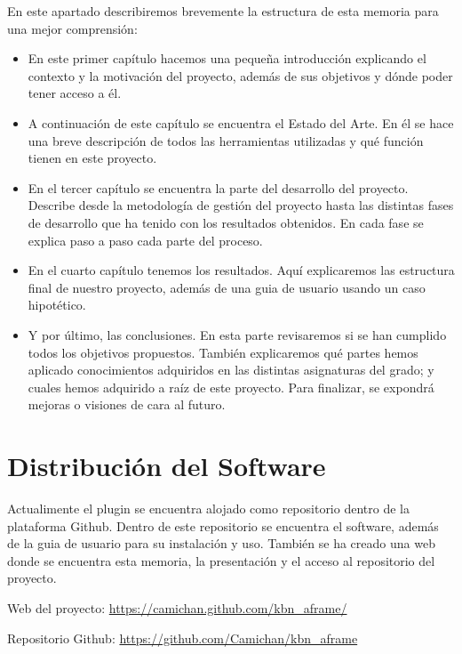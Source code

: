 \documentclass[a4paper, 12pt]{book}
\begin{document}
En este apartado describiremos brevemente la estructura de esta memoria para una mejor comprensión:

\begin{itemize}
    \item En este primer capítulo hacemos una pequeña introducción explicando el contexto y la motivación del proyecto, además de sus objetivos y dónde poder tener acceso a él.
    \item A continuación de este capítulo se encuentra el Estado del Arte. En él se hace una breve descripción de todos las herramientas utilizadas y qué función tienen en este proyecto.
    \item En el tercer capítulo se encuentra la parte del desarrollo del proyecto. Describe desde la metodología de gestión del proyecto hasta las distintas fases de desarrollo que ha tenido con los resultados obtenidos. En cada fase se explica paso a paso cada parte del proceso.
    \item En el cuarto capítulo tenemos los resultados. Aquí explicaremos las estructura final de nuestro proyecto, además de una guia de usuario usando un caso hipotético.
    \item Y por último, las conclusiones. En esta parte revisaremos si se han cumplido todos los objetivos propuestos. También explicaremos qué partes hemos aplicado conocimientos adquiridos en las distintas asignaturas del grado; y cuales hemos adquirido a raíz de este proyecto. Para finalizar, se expondrá mejoras o visiones de cara al futuro.
\end{itemize}



\section{Distribución del Software}
\label{sec:distribucion}

Actualimente el plugin se encuentra alojado como repositorio dentro de la plataforma Github. Dentro de este repositorio se encuentra el software, además de la guia de usuario para su instalación y uso. También se ha creado una web donde se encuentra esta memoria, la presentación y el acceso al repositorio del proyecto.

Web del proyecto: \url{https://camichan.github.com/kbn_aframe/}

Repositorio Github: \url{https://github.com/Camichan/kbn_aframe}


\end{document}
